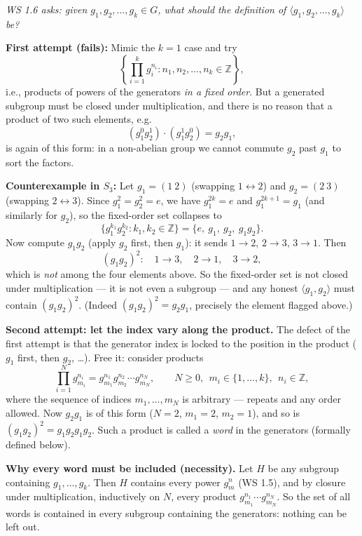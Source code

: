 \documentclass[11pt]{report}
\begin{document}
\begin{exbox}\label{ex:crafting-definition-gen-g1-gk}
\textit{WS 1.6 asks: given $g_1, g_2, \ldots, g_k \in G$, what should the definition of $\langle g_1, g_2, \ldots, g_k \rangle$ be?}

\textbf{First attempt (fails):} Mimic the $k = 1$ case and try
\[ \left\{ \prod_{i=1}^{k} g_i^{n_i} : n_1, n_2, \ldots, n_k \in \mathbb{Z} \right\}, \]
i.e., products of powers of the generators \emph{in a fixed order}. But a generated subgroup must be closed under multiplication, and there is no reason that a product of two such elements, e.g.
\[ (g_1^0 g_2^1) \cdot (g_1^1 g_2^0) = g_2 g_1, \]
is again of this form: in a non-abelian group we cannot commute $g_2$ past $g_1$ to sort the factors.

\textbf{Counterexample in $S_3$:} Let $g_1 = (1\ 2)$ (swapping $1 \leftrightarrow 2$) and $g_2 = (2\ 3)$ (swapping $2 \leftrightarrow 3$). Since $g_1^2 = g_2^2 = e$, we have $g_1^{2k} = e$ and $g_1^{2k+1} = g_1$ (and similarly for $g_2$), so the fixed-order set collapses to
\[ \{ g_1^{k_1} g_2^{k_2} : k_1, k_2 \in \mathbb{Z} \} = \{ e,\ g_1,\ g_2,\ g_1 g_2 \}. \]
Now compute $g_1 g_2$ (apply $g_2$ first, then $g_1$): it sends $1 \to 2$, $2 \to 3$, $3 \to 1$. Then
\[ (g_1 g_2)^2 : \quad 1 \to 3, \quad 2 \to 1, \quad 3 \to 2, \]
which is \emph{not} among the four elements above. So the fixed-order set is not closed under multiplication --- it is not even a subgroup --- and any honest $\langle g_1, g_2 \rangle$ must contain $(g_1 g_2)^2$. (Indeed $(g_1 g_2)^2 = g_2 g_1$, precisely the element flagged above.)

\textbf{Second attempt: let the index vary along the product.} The defect of the first attempt is that the generator index is locked to the position in the product ($g_1$ first, then $g_2$, \ldots). Free it: consider products
\[ \prod_{i=1}^{N} g_{m_i}^{n_i} = g_{m_1}^{n_1} g_{m_2}^{n_2} \cdots g_{m_N}^{n_N}, \qquad N \geq 0,\ \ m_i \in \{1, \ldots, k\},\ \ n_i \in \mathbb{Z}, \]
where the sequence of indices $m_1, \ldots, m_N$ is arbitrary --- repeats and any order allowed. Now $g_2 g_1$ is of this form ($N = 2$, $m_1 = 2$, $m_2 = 1$), and so is $(g_1 g_2)^2 = g_1 g_2 g_1 g_2$. Such a product is called a \emph{word} in the generators (formally defined below).

\textbf{Why every word must be included (necessity).} Let $H$ be any subgroup containing $g_1, \ldots, g_k$. Then $H$ contains every power $g_m^{n}$ (WS 1.5), and by closure under multiplication, inductively on $N$, every product $g_{m_1}^{n_1} \cdots g_{m_N}^{n_N}$. So the set of all words is contained in every subgroup containing the generators: nothing can be left out.


\end{exbox}
\end{document}
